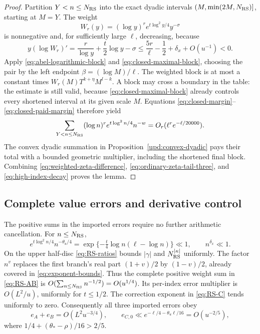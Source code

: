 \documentclass[11pt]{article}
\numberwithin{equation}{section}
\theoremstyle{definition}
\theoremstyle{remark}
\begin{document}
\begin{proof}
Partition $Y<n\le N_{\rm RS}$ into the exact dyadic intervals
$(M,\min(2M,N_{\rm RS})]$, starting at $M=Y$. The weight
\[
 W_r(y)=(\log y)^r e^{t\log^2y/4}y^{-\sigma}
\]
is nonnegative and, for sufficiently large $\ell$, decreasing, because
\begin{equation}
 y(\log W_r)'=\frac r{\log y}+\frac t2\log y-\sigma
 \le\frac{5r}{\ell}-\frac12+\delta_x+O(u^{-1})<0.
 \label{eq:weighted-block-monotonicity}
\end{equation}
Apply \eqref{eq:abel-logarithmic-block} and
\eqref{eq:closed-maximal-block}, choosing the pair by the left endpoint
$\beta=(\log M)/\ell$. The weighted block is at most a constant times
$W_r(M)T^{k+\eta}M^{l-k}$. A block may cross a boundary in the table:
the estimate is still valid, because \eqref{eq:closed-maximal-block}
already controls every shortened interval at its given scale $M$.
Equations \eqref{eq:closed-margin}--\eqref{eq:closed-paid-margin}
therefore yield
\begin{equation}
 \sum_{Y<n\le N_{\rm RS}}(\log n)^r e^{t\log^2n/4}n^{-w}
       =O_r(\ell^re^{-\ell/20000}).
 \label{eq:high-index-decay}
\end{equation}
The convex dyadic summation in Proposition~\ref{upd:convex-dyadic}
pays their total with a bounded geometric multiplier, including the
shortened final block. Combining
\eqref{eq:weighted-zeta-difference},
\eqref{eq:ordinary-zeta-tail-three}, and \eqref{eq:high-index-decay}
proves the lemma.
\end{proof}

\subsection{Complete value errors and derivative control}
The positive sums in the imported errors require no further arithmetic
cancellation. For $n\le N_{\rm RS}$,
\[
 e^{t\log^2n/4}n^{-\theta_u/4}
 =\exp\{-\tfrac t4\log n(\ell-\log n)\}\ll1,
 \qquad n^{\delta_x}\ll1.
\]
On the upper half-disc \eqref{eq:RS-ratios} bounds $|\gamma|$ and
$N_{\rm RS}^{|\kappa|}$ uniformly. The factor $n^v$ replaces the first
branch's real part $(1+v)/2$ by $(1-v)/2$, already covered in
\eqref{eq:exponent-bounds}. Thus the complete positive weight sum in
\eqref{eq:RS-AB} is $O(\sum_{n\le N_{\rm RS}}n^{-1/2})=O(u^{1/4})$.
Its per-index error multiplier is $O(L^2/u)$, uniformly for $t\le1/2$.
The correction exponent in \eqref{eq:RS-C} tends uniformly to zero.
Consequently all three imported errors obey
\begin{equation}
 e_A+e_B=O(L^2u^{-3/4}),\qquad
 e_{C,0}\ll e^{-\ell/4-\theta_u\ell/16}=O(u^{-2/5}),
 \label{eq:RS-small-errors}
\end{equation}
where $1/4+(\theta_*-\rho)/16>2/5$.
\end{document}
